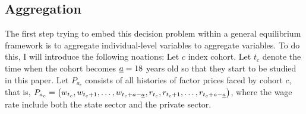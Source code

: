 \documentclass[12pt]{article}
\newcommand{\highlightR}[1]{{\color{MyRed}{#1}}}
\theoremstyle{definition}
\begin{document}
\begin{spacing}{1}
\highlightR{\bf In the next two or three weeks, I think I will try to play with the data and identify people's wage process, sector mobility patterns, and in the meantime, read more production side papers.}

\subsection{Aggregation}

The first step trying to embed this decision problem within a general equilibrium framework is to aggregate individual-level variables to aggregate variables. To do this, I will introduce the following noations: Let $c$ index cohort. Let $t_c$ denote the time when the cohort becomes $\underline{a} = 18$ years old so that they start to be studied in this paper. Let $P_{a_c}$ consists of all histories of factor prices faced by cohort $c$, that is, $P_{a_c} = \left( w_{t_c}, w_{t_c + 1}, \ldots, w_{t_c + a - \underline{a}}, r_{t_c}, r_{t_c + 1}, \ldots, r_{t_c + a - \underline{a}} \right)$, where the wage rate include both the state sector and the private sector. 






\newpage


\end{spacing}
\end{document}
